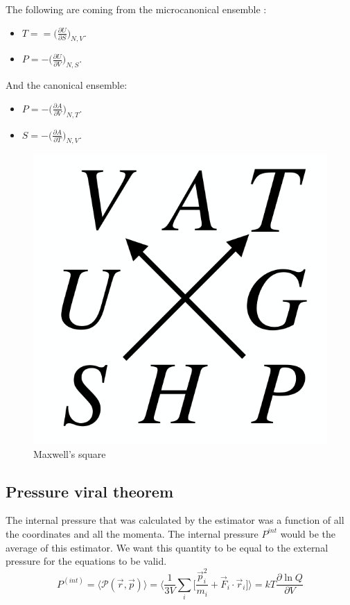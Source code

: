 The following are coming from the microcanonical ensemble :
	\begin{multicols}{2}
		\begin{itemize}
			\item $T = =\biggl(\frac{\partial U}{\partial S}\biggr)_{N, V}$.
			\item $P = - \biggl(\frac{\partial U}{\partial V}\biggr)_{N, S}$.
		\end{itemize}
	\end{multicols}
	
And the canonical ensemble:
	\begin{multicols}{2}
		\begin{itemize}
			\item $P = -\biggl(\frac{\partial A}{\partial V}\biggr)_{N, T}$.
			\item $S = - \biggl(\frac{\partial A}{\partial T}\biggr)_{N, V}$.
		\end{itemize}
	\end{multicols}

	\begin{figure}[H]
		\includegraphics[scale = 0.1]{maxwell_square}
		\centering
		\caption{Maxwell's square}
	\end{figure}

 
	\subsection{Pressure viral theorem}
	The internal pressure that was calculated by the estimator was a function of all the coordinates and all the momenta. The internal pressure $P^{int}$ would be the average of this estimator. We want this quantity to be equal to the external pressure for the equations to be valid. 
	$$P^{(int)} =\langle\mathcal{P}(\vec{r}, \vec{p})\rangle = \biggl\langle\frac{1}{3V}\sum\limits_i\biggl[\frac{\vec{p}_i^2}{m_i} + \vec{F}_i\cdot\vec{r}_i\biggr]\biggr\rangle = kT\frac{\partial\ln Q}{\partial V}$$

